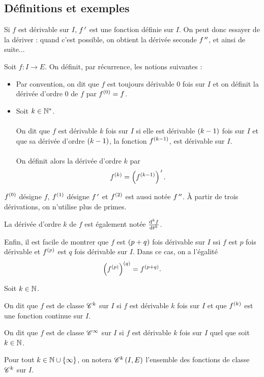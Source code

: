 \subsection{Définitions et exemples}

Si \(f\) est dérivable sur \(I\), \(f^{\,\prime}\) est une fonction définie sur \(I\). On peut donc essayer de la dériver : quand c'est possible, on obtient la dérivée seconde \(f^{\,\prime\prime}\), et ainsi de suite...

\begin{defi}
Soit \(f:I\to E\). On définit, par récurrence, les notions suivantes :

\begin{itemize}
    \item Par convention, on dit que \(f\) est toujours dérivable \(0\) fois sur \(I\) et on définit la dérivée d'ordre \(0\) de \(f\) par \(f^{\left(0\right)}=f\). \\
    \item Soit \(k\in\mathbb{N}^*\). \\\\ On dit que \(f\) est dérivable \(k\) fois sur \(I\) si elle est dérivable \(\left(k-1\right)\) fois sur \(I\) et que sa dérivée d'ordre \(\left(k-1\right)\), la fonction \(f^{\left(k-1\right)}\), est dérivable sur \(I\). \\\\ On définit alors la dérivée d'ordre \(k\) par \[f^{\left(k\right)}=\left(f^{\left(k-1\right)}\right)^{\,\prime}.\]
\end{itemize}
\end{defi}

\begin{rem}
\(f^{\left(0\right)}\) désigne \(f\), \(f^{\left(1\right)}\) désigne \(f^{\,\prime}\) et \(f^{\left(2\right)}\) est aussi notée \(f^{\,\prime\prime}\). À partir de trois dérivations, on n'utilise plus de primes.
\end{rem}

La dérivée d'ordre \(k\) de \(f\) est également notée \(\odv[order=k]{f}{t}\).

Enfin, il est facile de montrer que \(f\) est \(\left(p+q\right)\) fois dérivable sur \(I\) ssi \(f\) est \(p\) fois dérivable et \(f^{\left(p\right)}\) est \(q\) fois dérivable sur \(I\). Dans ce cas, on a l'égalité \[\left(f^{\left(p\right)}\right)^{\left(q\right)}=f^{\left(p+q\right)}.\]

\begin{defi}
Soit \(k\in\mathbb{N}\).

On dit que \(f\) est de classe \(\mathscr{C}^{k}\) sur \(I\) si \(f\) est dérivable \(k\) fois sur \(I\) et que \(f^{\left(k\right)}\) est une fonction continue sur \(I\).

On dit que \(f\) est de classe \(\mathscr{C}^{\infty}\) sur \(I\) si \(f\) est dérivable \(k\) fois sur \(I\) quel que soit \(k\in\mathbb{N}\).

Pour tout \(k\in\mathbb{N}\cup\left\lbrace\infty\right\rbrace\), on notera \(\mathscr{C}^{k}\left(I,E\right)\) l'ensemble des fonctions de classe \(\mathscr{C}^{k}\) sur \(I\).
\end{defi}


